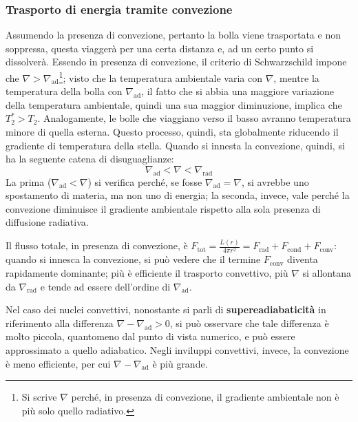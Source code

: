 \documentclass[11pt, a4paper]{scrartcl}
\theoremstyle{style}
\theoremstyle{style1}
\numberwithin{equation}{subsection}
\begin{document}
\subsubsection{Trasporto di energia tramite convezione}
Assumendo la presenza di convezione, pertanto la bolla viene trasportata e non soppressa, questa viagger\`a per una certa distanza e, ad un certo punto si dissolver\`a. 
Essendo in presenza di convezione, il criterio di Schwarzschild impone che $\nabla > \nabla _\text{ad}$\footnote{Si scrive $\nabla $ perch\'e, in presenza di convezione, il gradiente ambientale non \`e pi\`u solo quello radiativo.}; visto che la temperatura ambientale varia con $\nabla $, mentre la temperatura della bolla con $\nabla _\text{ad}$, il fatto che si abbia una maggiore variazione della temperatura ambientale, quindi una sua maggior diminuzione, implica che $T_2^* > T_2$.
Analogamente, le bolle che viaggiano verso il basso avranno temperatura minore di quella esterna.
Questo processo, quindi, sta globalmente riducendo il gradiente di temperatura della stella.
Quando si innesta la convezione, quindi, si ha la seguente catena di disuguaglianze:
\begin{equation}
	\nabla _\text{ad} < \nabla  < \nabla _\text{rad}
\end{equation}
La prima ($\nabla_\text{ad} < \nabla $) si verifica perch\'e, se fosse $\nabla _\text{ad} = \nabla $, si avrebbe uno spostamento di materia, ma non uno di energia; la seconda, invece, vale perch\'e la convezione diminuisce il gradiente ambientale rispetto alla sola presenza di diffusione radiativa.

Il flusso totale, in presenza di convezione, \`e $F_\text{tot} = \frac{L(r)}{4\pi r^2} = F_\text{rad} + F_\text{cond} + F_\text{conv}$: quando si innesca la convezione, si pu\`o vedere che il termine $F_\text{conv}$ diventa rapidamente dominante; pi\`u \`e efficiente il trasporto convettivo, pi\`u $\nabla $ si allontana da $\nabla _\text{rad}$ e tende ad essere dell'ordine di $\nabla _\text{ad}$.

Nel caso dei nuclei convettivi, nonostante si parli di \textbf{supereadiabaticit\`a} in riferimento alla differenza $\nabla - \nabla _\text{ad} > 0$, si pu\`o osservare che tale differenza \`e molto piccola, quantomeno dal punto di vista numerico, e pu\`o essere approssimato a quello adiabatico.
Negli inviluppi convettivi, invece, la convezione \`e meno efficiente, per cui $\nabla - \nabla _\text{ad}$ \`e pi\`u grande.
\end{document}
